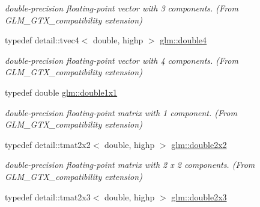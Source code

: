 \begin{DoxyCompactItemize}
\begin{DoxyCompactList}\small\item\em double-\/precision floating-\/point vector with 3 components. (From G\+L\+M\+\_\+\+G\+T\+X\+\_\+compatibility extension) \end{DoxyCompactList}\item 
typedef detail\+::tvec4$<$ double, highp $>$ \hyperlink{group__gtx__compatibility_ga1edf736b418528a2fc87d826f7697b9d}{glm\+::double4}\hypertarget{group__gtx__compatibility_ga1edf736b418528a2fc87d826f7697b9d}{}\label{group__gtx__compatibility_ga1edf736b418528a2fc87d826f7697b9d}

\begin{DoxyCompactList}\small\item\em double-\/precision floating-\/point vector with 4 components. (From G\+L\+M\+\_\+\+G\+T\+X\+\_\+compatibility extension) \end{DoxyCompactList}\item 
typedef double \hyperlink{group__gtx__compatibility_ga1c87d3042377335eb050a20ab0ec148a}{glm\+::double1x1}\hypertarget{group__gtx__compatibility_ga1c87d3042377335eb050a20ab0ec148a}{}\label{group__gtx__compatibility_ga1c87d3042377335eb050a20ab0ec148a}

\begin{DoxyCompactList}\small\item\em double-\/precision floating-\/point matrix with 1 component. (From G\+L\+M\+\_\+\+G\+T\+X\+\_\+compatibility extension) \end{DoxyCompactList}\item 
typedef detail\+::tmat2x2$<$ double, highp $>$ \hyperlink{group__gtx__compatibility_ga75cfac00b48c51f4b677151f789b8547}{glm\+::double2x2}\hypertarget{group__gtx__compatibility_ga75cfac00b48c51f4b677151f789b8547}{}\label{group__gtx__compatibility_ga75cfac00b48c51f4b677151f789b8547}

\begin{DoxyCompactList}\small\item\em double-\/precision floating-\/point matrix with 2 x 2 components. (From G\+L\+M\+\_\+\+G\+T\+X\+\_\+compatibility extension) \end{DoxyCompactList}\item 
typedef detail\+::tmat2x3$<$ double, highp $>$ \hyperlink{group__gtx__compatibility_gac267cd849a60e6e96350aa5fd665d5ef}{glm\+::double2x3}\hypertarget{group__gtx__compatibility_gac267cd849a60e6e96350aa5fd665d5ef}{}\label{group__gtx__compatibility_gac267cd849a60e6e96350aa5fd665d5ef}


\end{DoxyCompactItemize}
